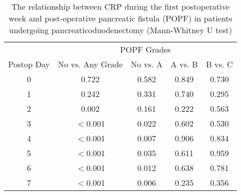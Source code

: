 \begin{table}[h]
	\centering
	\caption{The relationship between CRP during the first postoperative week and post-operative pancreatic fistula (POPF) in patients undergoing pancreaticoduodenectomy (Mann-Whitney U test) }
	\label{table:crp_comp_vs_POPF_ISGPS_p_values_only}
	\renewcommand{\arraystretch}{1.2} %
	\begin{tabular}{| c | c c c c |}
		\hline
		           &         \multicolumn{4}{c}{POPF Grades}         \\
		Postop Day & No vs. Any Grade & No vs. A & A vs. B & B vs. C \\ \hline
		0          & 0.722            & 0.582    & 0.849   & 0.730   \\
		1          & 0.242            & 0.331    & 0.740   & 0.295   \\
		2          & 0.002            & 0.161    & 0.222   & 0.563   \\
		3          & $<$0.001         & 0.022    & 0.602   & 0.530   \\
		4          & $<$0.001         & 0.007    & 0.906   & 0.834   \\
		5          & $<$0.001         & 0.035    & 0.611   & 0.959   \\
		6          & $<$0.001         & 0.012    & 0.638   & 0.781   \\
		7          & $<$0.001         & 0.006    & 0.235   & 0.356   \\ \hline
	\end{tabular}
\end{table}